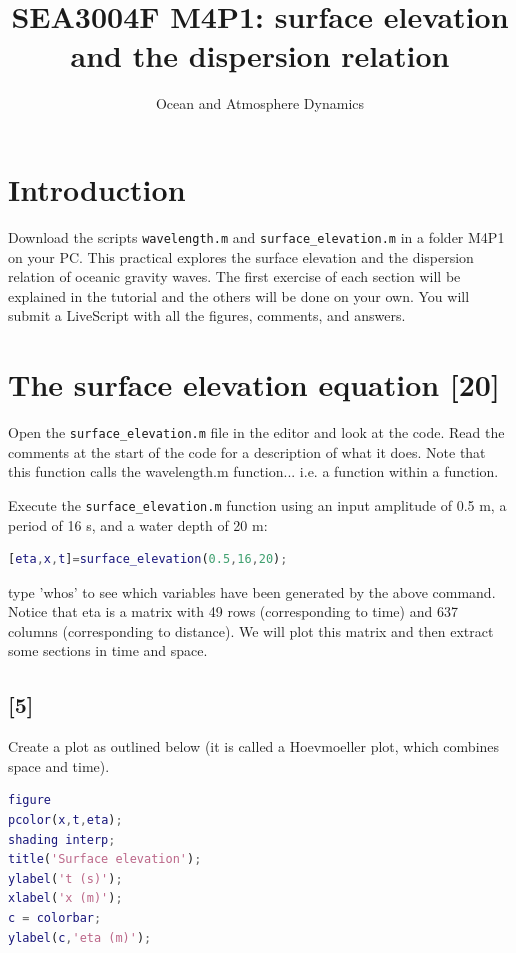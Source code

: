 \documentclass[a4paper,english]{scrartcl}
\begin{document}
\title{SEA3004F M4P1: surface elevation and the dispersion relation}
\date{Ocean and Atmosphere Dynamics}
\maketitle

\section{Introduction}
Download the scripts \texttt{wavelength.m} and \texttt{surface\_elevation.m} in a folder M4P1 on your PC.
This practical explores the surface elevation and the dispersion relation of oceanic gravity waves. The first exercise of each section will be explained in the tutorial and the others will be done on your own. You will submit a LiveScript with all the figures, comments, and answers.

\section{The surface elevation equation [20]}

Open the \texttt{surface\_elevation.m} file in the editor and look at the code. Read the comments at the start of the code for a description of what it does. Note that this function calls the wavelength.m function... i.e. a function within a function.

Execute the \texttt{surface\_elevation.m} function using an input amplitude of 0.5 m, a period of 16 s, and a water depth of 20 m:

\begin{lstlisting}[language=Matlab,basicstyle={\small},showstringspaces=false,frame=lines]
[eta,x,t]=surface_elevation(0.5,16,20);
\end{lstlisting}

type 'whos' to see which variables have been generated by the above command. Notice that eta is a matrix with 49 rows (corresponding to time) and 637 columns (corresponding to distance). We will plot this matrix and then extract some sections in time and space.

\subsection{[5]}

 Create a plot as outlined below (it is called a Hoevmoeller plot, which combines space and time). 

\begin{lstlisting}[language=Matlab,basicstyle={\small},showstringspaces=false,frame=lines]
figure
pcolor(x,t,eta);
shading interp;
title('Surface elevation');
ylabel('t (s)');
xlabel('x (m)');
c = colorbar;
ylabel(c,'eta (m)');
\end{lstlisting}
\end{document}
